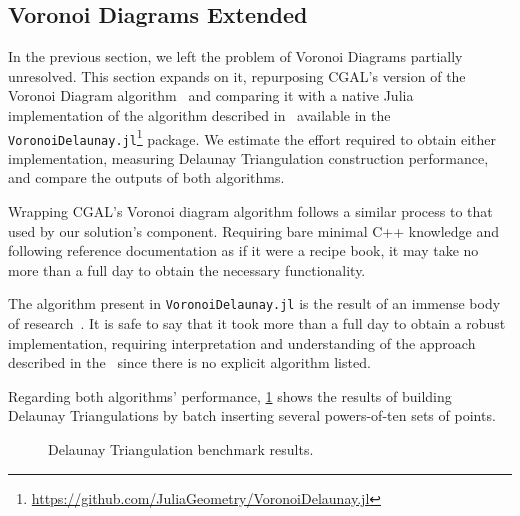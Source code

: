\subsection{Voronoi Diagrams Extended}%
\label{sec:eval.voronoi}

In the previous section, we left the problem of Voronoi Diagrams partially
unresolved.  This section expands on it, repurposing \ac{CGAL}'s version of the
Voronoi Diagram algorithm~\cite{CGAL:5.3:VDA2} and comparing it with a native
Julia implementation of the algorithm described in~\cite{Springel:2010:GCHSMM}
available in the
\texttt{VoronoiDelaunay.jl}\footnote{\url{https://github.com/JuliaGeometry/VoronoiDelaunay.jl}}
package.  We estimate the effort required to obtain either implementation,
measuring Delaunay Triangulation construction performance, and compare the
outputs of both algorithms.

Wrapping \ac{CGAL}'s Voronoi diagram algorithm follows a similar process to that
used by our solution's \wrapper{} component.  Requiring bare minimal C++
knowledge and following reference documentation as if it were a recipe book, it
may take no more than a full day to obtain the necessary functionality.

The algorithm present in \texttt{VoronoiDelaunay.jl} is the result of an immense
body of research~\cite{Springel:2010:GCHSMM}.  It is safe to say that it took
more than a full day to obtain a robust implementation, requiring interpretation
and understanding of the approach described in the~\cite{Springel:2010:GCHSMM}
since there is no explicit algorithm listed.

Regarding both algorithms' performance, \cref{fig:eval.voronoi.bench} shows
the results of building Delaunay Triangulations by batch inserting several
powers-of-ten sets of points.

\begin{figure}[htb]
  \centering
  \caption{\label{fig:eval.voronoi.bench}
    Delaunay Triangulation benchmark results.}%
\end{figure}

